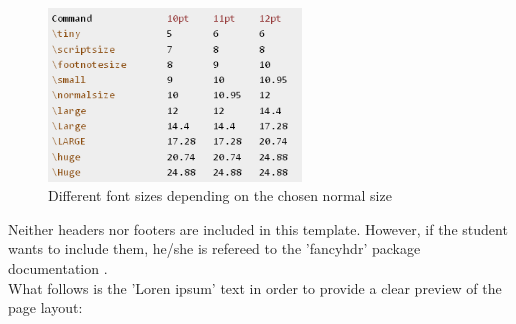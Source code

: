 \begin{figure}[hbtp]
\centering
\includegraphics[width=0.6\textwidth]{Chapter_1/font_sizes}
\caption{Different font sizes depending on the chosen normal size}
\label{font_sizes}
\end{figure}

Neither headers nor footers are included in this template. However, if the student wants to include them, he/she is refereed to the 'fancyhdr' package documentation \citep{fancyhdr_doc}.\\


What follows is the 'Loren ipsum' text in order to provide a clear preview of the page layout:
\vspace{5mm}

\lipsum

